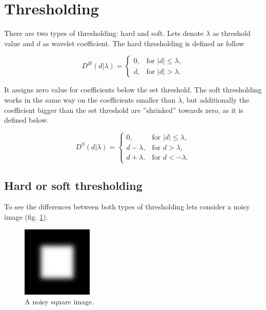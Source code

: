 \section{Thresholding}
\label{sec:threshold}
There are two types of thresholding: hard and soft. Lets denote $\lambda$ as threshold value and $d$ as wavelet coefficient. The hard thresholding is defined as follow

\begin{equation}
D^H(d|\lambda)=
\begin{cases}
0, & \text{for } |d| \leq \lambda, \\
d, & \text{for } |d| > \lambda.
\end{cases}
\end{equation}

It assigns zero value for coefficients below the set threshold. The soft thresholding works in the same way on the coefficients smaller than $\lambda$, but additionally the coefficient bigger than the set threshold are ''shrinked'' towards zero, as it is defined below.

\begin{equation}
D^S(d|\lambda)=
\begin{cases}
	0, & \text{for } |d| \leq \lambda, \\
	d-\lambda, & \text{for } d > \lambda, \\
	d+\lambda, & \text{for } d < -\lambda.
\end{cases}
\end{equation}


\subsection{Hard or soft thresholding}

To see the differences between both types of thresholding lets consider a noisy image (fig. \ref{fig:square_s10}).

\begin{figure}[h]
	\centering
	\includegraphics[width=0.3\textwidth]{graphs/square_s10.png}
	\caption{A noisy square image.}
	\label{fig:square_s10}
\end{figure}

